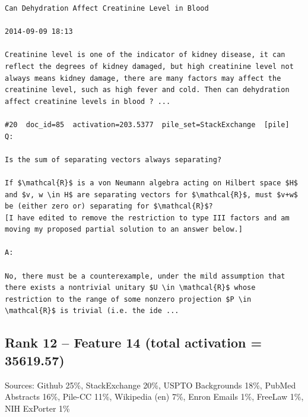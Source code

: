\begin{verbatim}
Can Dehydration Affect Creatinine Level in Blood

2014-09-09 18:13

Creatinine level is one of the indicator of kidney disease, it can reflect the degrees of kidney damaged, but high creatinine level not always means kidney damage, there are many factors may affect the creatinine level, such as high fever and cold. Then can dehydration affect creatinine levels in blood ? ...

#20  doc_id=85  activation=203.5377  pile_set=StackExchange  [pile]
Q:

Is the sum of separating vectors always separating?

If $\mathcal{R}$ is a von Neumann algebra acting on Hilbert space $H$ and $v, w \in H$ are separating vectors for $\mathcal{R}$, must $v+w$ be (either zero or) separating for $\mathcal{R}$?
[I have edited to remove the restriction to type III factors and am moving my proposed partial solution to an answer below.]

A:

No, there must be a counterexample, under the mild assumption that there exists a nontrivial unitary $U \in \mathcal{R}$ whose restriction to the range of some nonzero projection $P \in \mathcal{R}$ is trivial (i.e. the ide ...

\end{verbatim}

\subsection*{Rank 12 -- Feature 14 (total activation = 35619.57)}

Sources: Github 25\%, StackExchange 20\%, USPTO Backgrounds 18\%, PubMed Abstracts 16\%, Pile-CC 11\%, Wikipedia (en) 7\%, Enron Emails 1\%, FreeLaw 1\%, NIH ExPorter 1\%

